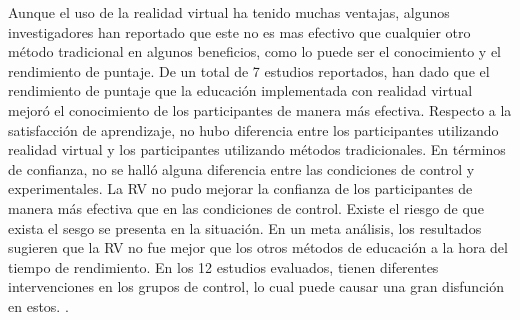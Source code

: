 Aunque el uso de la realidad virtual ha tenido muchas ventajas, algunos investigadores han reportado que este no es mas efectivo que cualquier otro método tradicional en algunos beneficios, como lo puede ser el conocimiento y el rendimiento de puntaje. De un total de 7 estudios reportados, han dado que el rendimiento de puntaje que la educación implementada con realidad virtual mejoró el conocimiento de los participantes de manera más efectiva. Respecto a la satisfacción de aprendizaje, no hubo diferencia entre los participantes utilizando realidad virtual y los participantes utilizando métodos tradicionales. En términos de confianza, no se halló alguna diferencia entre las condiciones de control y experimentales. La RV no pudo mejorar la confianza de los participantes de manera más efectiva que en las condiciones de control. Existe el riesgo de que exista el sesgo se presenta en la situación. En un meta análisis, los resultados sugieren que la RV no fue mejor que los otros métodos de educación a la hora del tiempo de rendimiento. En los 12 estudios evaluados, tienen diferentes intervenciones en los grupos de control, lo cual puede causar una gran disfunción en estos. \cite{chen2020effectiveness}.
